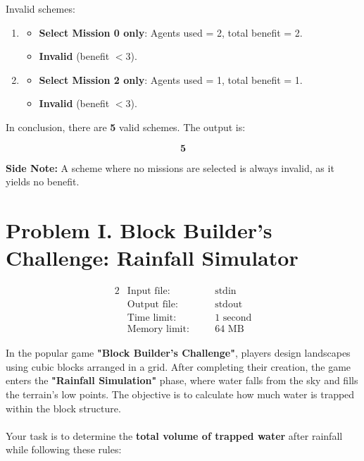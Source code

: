 \documentclass[12pt,a4paper]{article}
\begin{document}
\noindent
Invalid schemes:
\begin{enumerate}
    \item \begin{itemize}
        \item \textbf{Select Mission 0 only}: Agents used = 2, total benefit = 2. 
        \item \textbf{Invalid} (benefit \( < 3 \)).
    \end{itemize}
    \item \begin{itemize}
        \item \textbf{Select Mission 2 only}: Agents used = 1, total benefit = 1. 
        \item \textbf{Invalid} (benefit \( < 3 \)).
    \end{itemize}
\end{enumerate}

\noindent
In conclusion, there are \textbf{5} valid schemes. The output is:

\[
\mathbf{5}
\]

\noindent
\textbf{Side Note:} A scheme where no missions are selected is always invalid, as it yields no benefit.

\newpage

\section*{\fontsize{18}{12}Problem I. Block Builder's Challenge: Rainfall Simulator}

\begin{alignat*} {2}
 &   \text{Input file:}   \quad     &&\text{stdin}\\
 &   \text{Output file:}  \quad     &&\text{stdout}\\
 &   \text{Time limit:}   \quad     &&\text{1 second}\\
 &   \text{Memory limit:} \quad     &&\text{64 MB}
\end{alignat*}

\noindent
In the popular game \textbf{"Block Builder's Challenge"}, players design landscapes using cubic blocks arranged in a grid. After completing their creation, the game enters the \textbf{"Rainfall Simulation"} phase, where water falls from the sky and fills the terrain's low points. The objective is to calculate how much water is trapped within the block structure.
\\\\
\noindent
Your task is to determine the \textbf{total volume of trapped water} after rainfall while following these rules:
\end{document}

